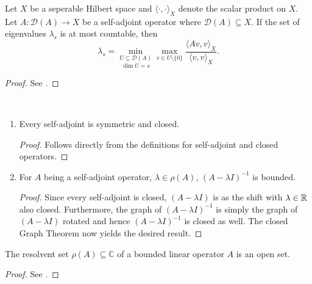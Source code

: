 \begin{atheorem}
	Let $X$ be a seperable Hilbert space and $\langle \cdot, \cdot \rangle_{X}$ denote the scalar product on $X$. Let $A \colon \mathcal{D}(A) \rightarrow X$ be a self-adjoint operator where $\mathcal{D}(A) \subseteq X$. If the set of eigenvalues $\lambda_{s}$ is at most countable, then
	\begin{equation*}
			\lambda_{s} = \underset{\dim U = s}{\min_{U \subseteq \mathcal{D}(A)}} \max_{v \in U \setminus \{ 0 \} } \frac{\langle A v, v \rangle_{X}}{\langle v, v \rangle_{X}}. 
	\end{equation*} 

	\begin{proof}
		See \cite[p. 119]{teschl2014mathematical}.
	\end{proof}
\end{atheorem}

\begin{atheorem} ~\
	\begin{enumerate}[label=\alph*\upshape)]
		\item Every self-adjoint is symmetric and closed.
			\begin{proof}
				 Follows directly from the definitions for self-adjoint and closed operators.
			\end{proof}
		\item For $A$ being a self-adjoint operator, $\lambda \in \rho(A)$, $(A - \lambda I)^{-1}$ is bounded.
			\begin{proof}
				Since every self-adjoint is closed, $(A - \lambda I)$ is as the shift with $\lambda \in \mathbb{R}$ also closed. Furthermore, the graph of $(A - \lambda I)^{-1}$ is simply the graph of $(A - \lambda I)$ rotated and hence $(A - \lambda I)^{-1}$ is closed as well. The closed Graph Theorem now yields the desired result.
			\end{proof}
	\end{enumerate}
\end{atheorem}

\begin{atheorem}
	The resolvent set $\rho(A) \subseteq \mathbb{C}$ of a bounded linear operator $A$ is an open set.
	
	\begin{proof}
		See \cite[p. 259]{werner2006funkana}.
	\end{proof}
\end{atheorem}

